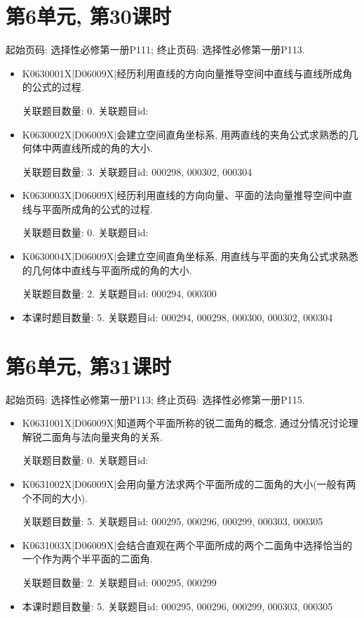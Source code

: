 \section*{第6单元, 第30课时}
起始页码: 选择性必修第一册P111; 终止页码: 选择性必修第一册P113.
\begin{itemize}
\item K0630001X|D06009X|经历利用直线的方向向量推导空间中直线与直线所成角的公式的过程.

关联题目数量: 0. 关联题目id: 

\item K0630002X|D06009X|会建立空间直角坐标系, 用两直线的夹角公式求熟悉的几何体中两直线所成的角的大小.

关联题目数量: 3. 关联题目id: 000298, 000302, 000304

\item K0630003X|D06009X|经历利用直线的方向向量、平面的法向量推导空间中直线与平面所成角的公式的过程.

关联题目数量: 0. 关联题目id: 

\item K0630004X|D06009X|会建立空间直角坐标系, 用直线与平面的夹角公式求熟悉的几何体中直线与平面所成的角的大小.

关联题目数量: 2. 关联题目id: 000294, 000300

\item 本课时题目数量: 5. 关联题目id: 000294, 000298, 000300, 000302, 000304

\end{itemize}

\section*{第6单元, 第31课时}
起始页码: 选择性必修第一册P113; 终止页码: 选择性必修第一册P115.
\begin{itemize}
\item K0631001X|D06009X|知道两个平面所称的锐二面角的概念, 通过分情况讨论理解锐二面角与法向量夹角的关系.

关联题目数量: 0. 关联题目id: 

\item K0631002X|D06009X|会用向量方法求两个平面所成的二面角的大小(一般有两个不同的大小).

关联题目数量: 5. 关联题目id: 000295, 000296, 000299, 000303, 000305

\item K0631003X|D06009X|会结合直观在两个平面所成的两个二面角中选择恰当的一个作为两个半平面的二面角.

关联题目数量: 2. 关联题目id: 000295, 000299

\item 本课时题目数量: 5. 关联题目id: 000295, 000296, 000299, 000303, 000305

\end{itemize}

